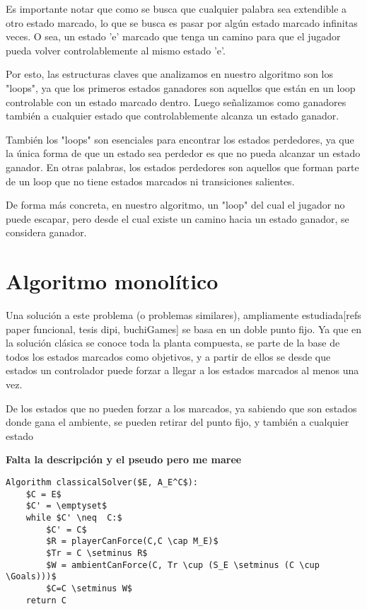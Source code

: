 Es importante notar que como se busca que cualquier palabra sea extendible a otro estado marcado, lo que se busca es pasar por algún estado marcado infinitas veces. O sea, un estado 'e' marcado que tenga un camino para que el jugador pueda volver controlablemente al mismo estado 'e'.

Por esto, las estructuras claves que analizamos en nuestro algoritmo son los "loops", ya que los primeros estados ganadores son aquellos que están en un loop controlable con un estado marcado dentro. Luego señalizamos como ganadores también a cualquier estado que controlablemente alcanza un estado ganador.

También los "loops" son esenciales para encontrar los estados perdedores, ya que la única forma de que un estado sea perdedor es que no pueda alcanzar un estado ganador. En otras palabras, los estados perdedores son aquellos que forman parte de un loop que no tiene estados marcados ni transiciones salientes.

De forma más concreta, en nuestro algoritmo, un "loop" del cual el jugador no puede escapar, pero desde el cual existe un camino hacia un estado ganador, se considera ganador.

\section{Algoritmo monolítico}

Una solución a este problema (o problemas similares), ampliamente estudiada[refs paper funcional, tesis dipi, buchiGames] se basa en un doble punto fijo. Ya que en la solución clásica se conoce toda la planta compuesta, se parte de la base de todos los estados marcados como objetivos, y a partir de ellos se desde que estados un controlador puede forzar a llegar a los estados marcados al menos una vez.

De los estados que no pueden forzar a los marcados, ya sabiendo que son estados donde gana el ambiente, se pueden retirar del punto fijo, y también a cualquier estado 

\textbf{Falta la descripción y el pseudo pero me maree}
\begin{lstlisting}[language={pseudocode},label={lst:classical},caption={Status confirmation.},float=ht]
Algorithm classicalSolver($E, A_E^C$):
	$C = E$
	$C' = \emptyset$
	while $C' \neq  C:$
		$C' = C$
		$R = playerCanForce(C,C \cap M_E)$
		$Tr = C \setminus R$
		$W = ambientCanForce(C, Tr \cup (S_E \setminus (C \cup \Goals)))$
		$C=C \setminus W$
	return C
\end{lstlisting}


